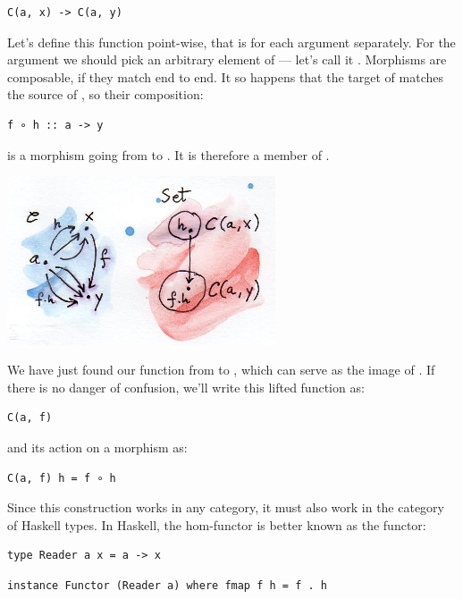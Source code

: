 \begin{verbatim}
C(a, x) -> C(a, y)
\end{verbatim}

Let's define this function point-wise, that is for each argument
separately. For the argument we should pick an arbitrary element of
 --- let's call it . Morphisms are
composable, if they match end to end. It so happens that the target of
 matches the source of , so their composition:

\begin{verbatim}
f ∘ h :: a -> y
\end{verbatim}

is a morphism going from  to . It is therefore a
member of .

\includegraphics[width=3.12500in]{images/hom-functor.jpg}

We have just found our function from  to
, which can serve as the image of . If there
is no danger of confusion, we'll write this lifted function as:

\begin{verbatim}
C(a, f)
\end{verbatim}

and its action on a morphism  as:

\begin{verbatim}
C(a, f) h = f ∘ h
\end{verbatim}

Since this construction works in any category, it must also work in the
category of Haskell types. In Haskell, the hom-functor is better known
as the  functor:

\begin{verbatim}
type Reader a x = a -> x
\end{verbatim}

\begin{verbatim}
instance Functor (Reader a) where fmap f h = f . h
\end{verbatim}

